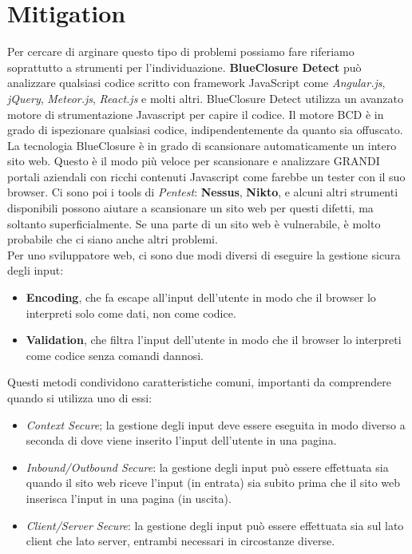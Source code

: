 \section{Mitigation}

Per cercare di arginare questo tipo di problemi possiamo fare riferiamo soprattutto a strumenti per l'individuazione.
\textbf{BlueClosure Detect} può ana\-lizzare qualsiasi codice scritto con framework JavaScript come
\textit{Angular.js}, \textit{jQuery}, \textit{Meteor.js}, \textit{React.js} e molti altri. BlueClosure Detect utilizza un avanzato motore di strumentazione Javascript per capire il codice. Il motore BCD è in grado di ispezionare qualsiasi codice, indipendentemente da quanto sia offuscato.
La tecnologia BlueClosure è in grado di scansionare automaticamente un intero sito web.
Questo è il modo più veloce per scansionare e analizzare GRANDI portali aziendali con ricchi contenuti Javascript come farebbe un tester con il suo browser.
Ci sono poi i tools di \textit{Pentest}: \textbf{Nessus}, \textbf{Nikto}, e alcuni altri strumenti disponibili possono aiutare a scansionare un sito web per questi difetti, ma soltanto superficialmente.
Se una parte di un sito web è vulnerabile, è molto probabile che ci siano anche altri problemi.\\

Per uno sviluppatore web, ci sono due modi diversi di eseguire la gestione sicura degli input:

\begin{itemize}
      \item \textbf{Encoding}, che fa escape all'input dell'utente in modo che il browser lo interpreti solo come dati, non come codice.
      \item \textbf{Validation}, che filtra l'input dell'utente in modo che il browser lo interpreti come codice senza comandi dannosi.
\end{itemize}

Questi metodi condividono caratteristiche comuni, importanti da comprendere
quando si utilizza uno di essi:

\begin{itemize}
      \item \textit{Context Secure}; la gestione degli input deve essere eseguita
            in modo diverso a
            seconda di dove viene inserito l'input dell'utente in una pagina.
      \item \textit{Inbound/Outbound Secure}: la gestione degli input può essere
            effettuata sia quando il
            sito web riceve l'input (in entrata) sia subito prima che il
            sito web
            inserisca l'input in una pagina (in uscita).
      \item \textit{Client/Server Secure}: la gestione degli input può essere
            effettuata sia sul lato client
            che lato server, entrambi necessari in circostanze diverse.
\end{itemize}

